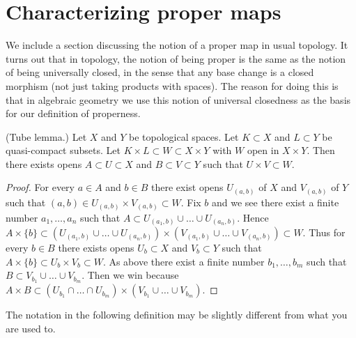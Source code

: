 \section{Characterizing proper maps}
\label{section-proper}

\noindent
We include a section discussing the notion of a proper map in usual
topology. It turns out that in topology, the notion of being proper
is the same as the notion of being universally closed, in the sense
that any base change is a closed morphism (not just taking products
with spaces). The reason for doing this is that in algebraic geometry
we use this notion of universal closedness as the basis for our
definition of properness.

\begin{lemma}
\label{lemma-tube}
(Tube lemma.)
Let $X$ and $Y$ be topological spaces.
Let $K \subset X$ and $L \subset Y$ be quasi-compact subsets.
Let $K \times L \subset W \subset X \times Y$ with $W$
open in $X \times Y$. Then there exists opens $A \subset U \subset X$
and $B \subset V \subset Y$ such that $U \times V \subset W$.
\end{lemma}

\begin{proof}
For every $a \in A$ and $b \in B$ there exist opens
$U_{(a, b)}$ of $X$ and $V_{(a, b)}$ of $Y$ such that
$(a, b) \in U_{(a, b)} \times V_{(a, b)} \subset W$.
Fix $b$ and we see there exist a finite number $a_1, \ldots, a_n$
such that $A \subset U_{(a_1, b)} \cup \ldots \cup U_{(a_n, b)}$.
Hence $A \times \{b\} \subset
(U_{(a_1, b)} \cup \ldots \cup U_{(a_n, b)}) \times
(V_{(a_1, b)} \cup \ldots \cup V_{(a_n, b)}) \subset W$.
Thus for every $b \in B$ there exists opens $U_b \subset X$ and
$V_b \subset Y$ such that $A \times \{b\} \subset U_b \times V_b \subset W$.
As above there exist a finite number $b_1, \ldots, b_m$ such
that $B \subset V_{b_1} \cup \ldots \cup V_{b_m}$.
Then we win because
$A \times B \subset
(U_{b_1} \cap \ldots \cap U_{b_m}) \times
(V_{b_1} \cup \ldots \cup V_{b_m})$.
\end{proof}

\noindent
The notation in the following definition may be slightly different
from what you are used to.

